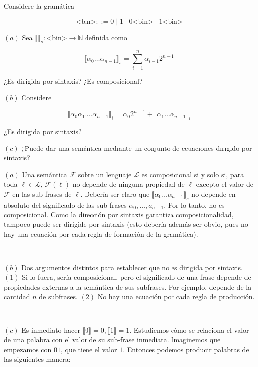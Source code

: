 \documentclass[article, 12pt]{article}
\begin{document}
\begin{myframe}
  Considere la gramática 

  \begin{equation*}
    \text{<bin>} ::= 0 \mid 1 \mid 0\text{<bin>} \mid 1\text{<bin>}
  \end{equation*}

  $(a)$ Sea $\llbracket  \rrbracket_s : \text{<bin>} \to \mathbb{N}$ definida
  como 

  \begin{equation*}
    \llbracket \alpha_0\ldots\alpha_{n-1} \rrbracket_{s} = \sum_{i=1}^n
    \alpha_{i-1}2^{n-1}
  \end{equation*}

  ¿Es dirigida por sintaxis? ¿Es composicional? 

  $(b)$ Considere 

  \begin{equation*}
    \llbracket \alpha_0 \alpha_1 \ldots. \alpha_{n-1} \rrbracket_i =
    \alpha_{0} 2^{n-1} + \llbracket \alpha_1 \ldots \alpha_{n-1} \rrbracket_i
  \end{equation*}

  ¿Es dirigida por sintaxis? 

  $(c)$ ¿Puede dar una semántica mediante un conjunto de ecuaciones dirigido por
  sintaxis?
\end{myframe}

$(a)$ Una semántica $\mathcal{F}$ sobre un lenguaje $\mathcal{L}$ es
composicional si y solo si, para toda $\ell \in \mathcal{L}$, $\mathcal{F}(\ell)$
no depende de ninguna propiedad de $\ell$ excepto el valor de $\mathcal{F}$ en
las sub-frases de $\ell$. Debería ser claro que $\llbracket
\alpha_0\ldots\alpha_{n-1} \rrbracket_s$ no
depende en absoluto del significado de las sub-frases $\alpha_0, \ldots,
a_{n-1}$. Por lo tanto, no es composicional. Como la dirección por sintaxis
garantiza composicionalidad, tampoco puede ser dirigido por sintaxis (esto
debería además ser obvio, pues no hay una ecuación por cada regla de formación
de la gramática).

~

$(b)$ Dos argumentos distintos para establecer que no es dirigida por sintaxis.
$(1)$ Si lo fuera, sería composicional, pero el significado de una frase depende
de propiedades externas a la semántica de sus subfrases. Por ejemplo, depende de
la cantidad $n$ de subfrases. $(2)$ No hay una ecuación por cada regla de
producción.

~ 

$(c)$ Es inmediato hacer $\llbracket 0 \rrbracket = 0, \llbracket 1 \rrbracket =
1$. Estudiemos cómo se relaciona el valor de una palabra con el valor de su
sub-frase inmediata. Imaginemos que empezamos con $01$, que tiene el valor $1$.
Entonces podemos producir palabras de las siguientes manera:
\end{document}
